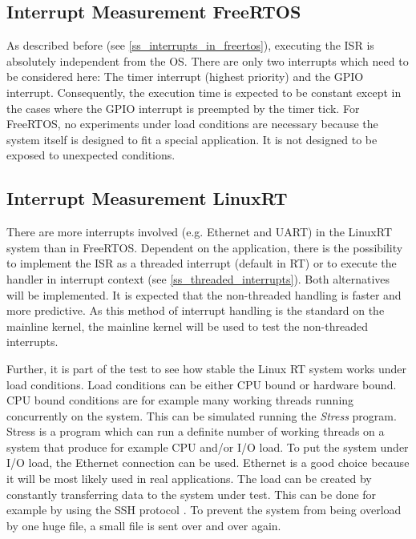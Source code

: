 \subsection{Interrupt Measurement FreeRTOS}
As described before (see \ref{ss_interrupts_in_freertos}), executing the \ac{ISR} is absolutely independent from the \ac{OS}.
There are only two interrupts which need to be considered here: The timer interrupt (highest priority) and the \ac{GPIO} interrupt.
Consequently, the execution time is expected to be constant except in the cases where the \ac{GPIO} interrupt is preempted by the timer tick.
For FreeRTOS, no experiments under load conditions are necessary because the system itself is designed to fit a special application.
It is not designed to be exposed to unexpected conditions. 

\subsection{Interrupt Measurement LinuxRT}
There are more interrupts involved (e.g. Ethernet and \ac{UART}) in the LinuxRT system than in FreeRTOS.
Dependent on the application, there is the possibility to implement the \ac{ISR} as a threaded interrupt (default in RT) or to execute the handler in interrupt context (see \ref{ss_threaded_interrupts}).
Both alternatives will be implemented.
It is expected that the non-threaded handling is faster and more predictive.
As this method of interrupt handling is the standard on the mainline kernel, the mainline kernel will be used to test the non-threaded interrupts.
\par
Further, it is part of the test to see how stable the Linux RT system works under load conditions.
Load conditions can be either \ac{CPU} bound or hardware bound. 
\ac{CPU} bound conditions are for example many working threads running concurrently on the system.
This can be simulated running the \textit{Stress} \cite{stress} program.
Stress is a program which can run a definite number of working threads on a system that produce for example \ac{CPU} and/or \ac{I/O} load.
To put the system under \ac{I/O} load, the Ethernet connection can be used.
Ethernet is a good choice because it will be most likely used in real applications.
The load can be created by constantly transferring data to the system under test.
This can be done for example by using the \ac{SSH} protocol \cite{tlip:tsspa}.
To prevent the system from being overload by one huge file, a small file is sent over and over again. 


